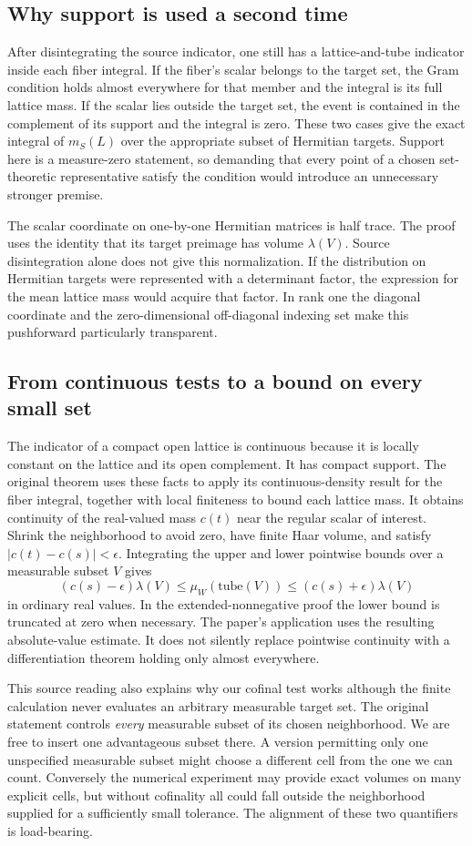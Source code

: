 \documentclass[12pt,letterpaper]{article}
\newcommand{\code}[1]{\texttt{\detokenize{#1}}}
\begin{document}
\subsection{Why support is used a second time}
After disintegrating the source indicator, one still has a lattice-and-tube indicator inside each fiber integral. If the fiber's scalar belongs to the target set, the Gram condition holds almost everywhere for that member and the integral is its full lattice mass. If the scalar lies outside the target set, the event is contained in the complement of its support and the integral is zero. These two cases give the exact integral of $m_S(L)$ over the appropriate subset of Hermitian targets. Support here is a measure-zero statement, so demanding that every point of a chosen set-theoretic representative satisfy the condition would introduce an unnecessary stronger premise.
\par
The scalar coordinate on one-by-one Hermitian matrices is half trace. The proof uses the identity that its target preimage has \code{coordHerm} volume $\lambda(V)$. Source disintegration alone does not give this normalization. If the distribution on Hermitian targets were represented with a determinant factor, the expression for the mean lattice mass would acquire that factor. In rank one the diagonal coordinate and the zero-dimensional off-diagonal indexing set make this pushforward particularly transparent.
\subsection{From continuous tests to a bound on every small set}
The indicator of a compact open lattice is continuous because it is locally constant on the lattice and its open complement. It has compact support. The original theorem uses these facts to apply its continuous-density result for the fiber integral, together with local finiteness to bound each lattice mass. It obtains continuity of the real-valued mass $c(t)$ near the regular scalar of interest. Shrink the neighborhood to avoid zero, have finite Haar volume, and satisfy $|c(t)-c(s)|<\epsilon$. Integrating the upper and lower pointwise bounds over a measurable subset $V$ gives
\[
 (c(s)-\epsilon)\lambda(V)\leq \mu_W(\mathrm{tube}(V))
              \leq(c(s)+\epsilon)\lambda(V)
\]
in ordinary real values. In the extended-nonnegative proof the lower bound is truncated at zero when necessary. The paper's application uses the resulting absolute-value estimate. It does not silently replace pointwise continuity with a differentiation theorem holding only almost everywhere.
\par
This source reading also explains why our cofinal test works although the finite calculation never evaluates an arbitrary measurable target set. The original statement controls \emph{every} measurable subset of its chosen neighborhood. We are free to insert one advantageous subset there. A version permitting only one unspecified measurable subset might choose a different cell from the one we can count. Conversely the numerical experiment may provide exact volumes on many explicit cells, but without cofinality all could fall outside the neighborhood supplied for a sufficiently small tolerance. The alignment of these two quantifiers is load-bearing.
\end{document}
